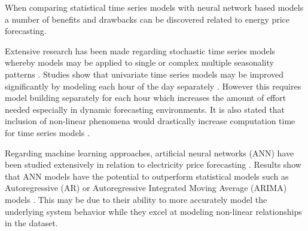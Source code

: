 

When comparing statistical time series models with neural network based models a number of benefits and drawbacks can be discovered related to energy price forecasting. 

Extensive research has been made regarding stochastic time series models whereby models may be applied to single \cite{garcia2005garch, weron2008forecastingWh, weron2008forecasting, nogales2002forecasting, cuaresma2004forecasting, tan2010day, conejo2005day} or complex multiple seasonality patterns \cite{de2011forecasting, gould2008forecasting, zivot2003vector}. 
Studies show that univariate time series models may be improved significantly by modeling each hour of the day separately \cite{cuaresma2004forecasting, weron2008forecasting}. However this requires model building separately for each hour which increases the amount of effort needed especially in dynamic forecasting environments. 
It is also stated that inclusion of non-linear phenomena would drastically increase computation time for time series models \cite{cuaresma2004forecasting}. 


Regarding machine learning approaches, artificial neural networks (ANN) have been studied extensively in relation to electricity price forecasting \cite{vahidinasab2008day, singhal2011electricity, pao2007forecasting, amjady2006day, catalao2007short, 
gareta2006forecasting, duanelectricity, szkuta1999electricity}. 
Results show that ANN models have the potential to outperform statistical models such as Autoregressive (AR) or Autoregressive Integrated Moving Average (ARIMA) models \cite{pao2007forecasting, catalao2007short}. This may be due to their ability to more accurately model the underlying system behavior while they excel at modeling non-linear relationships in the dataset. 

